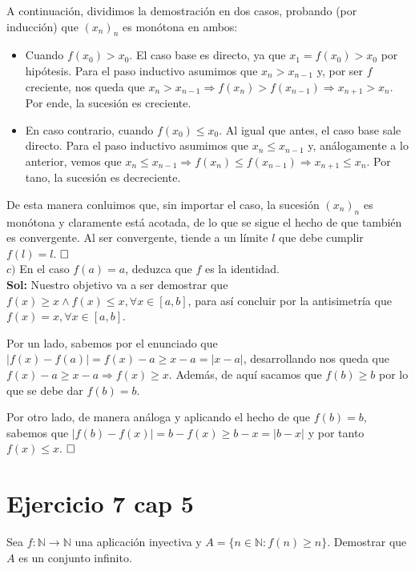 \documentclass{article}
\begin{document}
A continuación, dividimos la demostración en dos casos, probando (por inducción) que $(x_n)_n$ es monótona en ambos:

\begin{itemize}
    \item Cuando $f(x_0) > x_0$. El caso base es directo, ya que $x_1 = f(x_0) > x_0$ por hipótesis. Para el paso inductivo asumimos que $x_n > x_{n - 1}$ y, por ser $f$ creciente, nos queda que $x_n > x_{n - 1} \Longrightarrow f(x_n) > f(x_{n - 1}) \Longrightarrow x_{n + 1} > x_n$. Por ende, la sucesión es creciente.

    \item En caso contrario, cuando $f(x_0) \leq x_0$. Al igual que antes, el caso base sale directo. Para el paso inductivo asumimos que $x_n \leq x_{n - 1}$ y, análogamente a lo anterior, vemos que $x_n \leq x_{n - 1} \Longrightarrow f(x_n) \leq f(x_{n - 1}) \Longrightarrow x_{n + 1} \leq x_n$. Por tano, la sucesión es decreciente.
\end{itemize}

De esta manera conluimos que, sin importar el caso, la sucesión $(x_n)_n$ es monótona y claramente está acotada, de lo que se sigue el hecho de que también es convergente. Al ser convergente, tiende a un límite $l$ que debe cumplir $f(l) = l$. $\hfill\square$ \\

$c)$ En el caso $f(a) = a$, deduzca que $f$ es la identidad. \\

\noindent\textbf{Sol:} Nuestro objetivo va a ser demostrar que $f(x) \geq x \land f(x) \leq x, \forall x \in [a, b]$, para así concluir por la antisimetría que $f(x) = x, \forall x \in [a, b]$.

Por un lado, sabemos por el enunciado que $|f(x) - f(a)| = f(x) - a \geq x - a = |x - a|$, desarrollando nos queda que $f(x) - a \geq x - a \Longrightarrow f(x) \geq x$. Además, de aquí sacamos que $f(b) \geq b$ por lo que se debe dar $f(b) = b$.

Por otro lado, de manera análoga y aplicando el hecho de que $f(b) = b$, sabemos que $|f(b) - f(x)| = b - f(x) \geq b - x = |b - x|$ y por tanto $f(x) \leq x$. $\hfill\square$

\newpage

\section{Ejercicio 7 cap 5}

Sea $f : \mathbb{N} \longrightarrow \mathbb{N}$ una aplicación inyectiva y $A = \{n \in \mathbb{N} : f(n) \geq n\}$. Demostrar que $A$ es un conjunto infinito. \\
\end{document}
